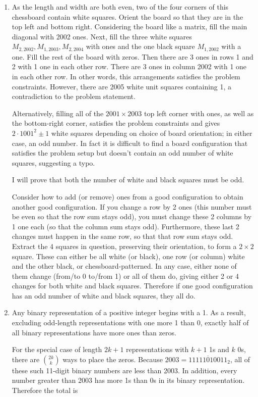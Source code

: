 \documentclass{book}
\numberwithin{equation}{section}
\begin{document}
\begin{enumerate}[label={9.\arabic*}]
\item
As the length and width are both even, two of the four corners of this chessboard contain white squares. Orient
the board so that they are in the top left and bottom right. Considering the board like a matrix, fill the main
diagonal with 2002 ones. Next, fill the three white squares $M_{2, 2002}, M_{1, 2003}, M_{2, 2004}$ with ones
and the one black square $M_{1, 2002}$ with a one. Fill the rest of the board with zeros. Then there are 3 ones
in rows 1 and 2 with 1 one in each other row. There are 3 ones in column 2002 with 1 one in each other row. In
other words, this arrangements satisfies the problem constraints. However, there are 2005 white unit squares
containing 1, a contradiction to the problem statement.

Alternatively, filling all of the $2001 \times 2003$ top left corner with ones, as well as the bottom-right corner,
satisfies the problem constraints and gives \\
$2\cdot1001^2 \pm 1$ white squares depending on
choice of board orientation; in either case, an odd number. In fact it is difficult to find a board configuration
that satisfies the problem setup but doesn't contain an odd number of white squares, suggesting a typo.

I will prove that both the number of white and black squares must be odd.

Consider how to add (or remove) ones from a good configuration to obtain another good configuration. If you change
a row by 2 ones (this number must be even so that the row sum stays odd), you must change these 2 columns
by 1 one each (so that the column sum stays odd). Furthermore, these last 2 changes must happen in the same row,
so that that row sum stays odd. Extract the 4 squares in question, preserving their orientation, to form a $2 \times 2$
square. These can either be all white (or black), one row (or column) white and the other black, or chessboard-patterned.
In any case, either none of them change (from/to 0 to/from 1) or all of them do, giving either 2 or 4 changes for both
white and black squares. Therefore if one good configuration has an odd number of white and black squares, they all do.

\item
Any binary representation of a positive integer begins with a 1. As a result, excluding
odd-length representations with one more 1 than 0, exactly half of all binary representations have
more ones than zeros.

For the special case of length $2k + 1$ representations with $k+1$ 1s and $k$ 0s, there are
${2k \choose k}$ ways to place the zeros. Because $2003 = \overline{11111010011}_2$, all of these
such 11-digit binary numbers are less than 2003. In addition, every number greater than 2003 has more
1s than 0s in its binary representation. Therefore the total is


\end{enumerate}
\end{document}
